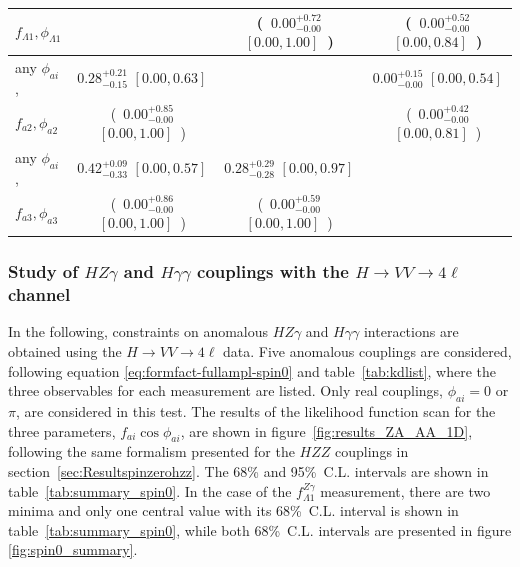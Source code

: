 \begin{table}
\begin{tabular}{lccc}
$f_{\Lambda1},\phi_{\Lambda1}$&   ~~~~  &   (~$0.00^{+0.72}_{-0.00}$ $[0.00,1.00]$~) &(~$0.00^{+0.52}_{-0.00}$ $[0.00,0.84]$~)  \\ \hline
any $\phi_{ai}$,
 &  $0.28^{+0.21}_{-0.15}$ $[0.00,0.63]$ &    ~~~~ &   $0.00^{+0.15}_{-0.00}$ $[0.00,0.54]$  \\
$f_{a2},\phi_{a2}$&   (~$0.00^{+0.85}_{-0.00}$ $[0.00,1.00]$~) &   ~~~~ & (~$0.00^{+0.42}_{-0.00}$ $[0.00,0.81]$~)  \\ \hline
any $\phi_{ai}$,
&  $0.42^{+0.09}_{-0.33}$ $[0.00,0.57]$ &   $0.28^{+0.29}_{-0.28}$ $[0.00,0.97]$ &    ~~~~  \\
$f_{a3},\phi_{a3}$&   (~$0.00^{+0.86}_{-0.00}$ $[0.00,1.00]$~) &   (~$0.00^{+0.59}_{-0.00}$ $[0.00,1.00]$~) & ~~~~  \\
\end{tabular}
\label{tab:Spin0_ZZ_1D_KDb}
\end{table}


\subsubsection{Study of \texorpdfstring{$HZ\gamma$}{HZgamma} and \texorpdfstring{$H\gamma\gamma$}{Hgammagamma} couplings with the \texorpdfstring{$H\to VV\to4\ell$}{H to VV to 4l} channel}  \label{sec:Resultspinzerohzg}

In the following, constraints on anomalous $HZ\gamma$ and $H\gamma\gamma$ interactions
are obtained using the $H\to VV\to 4\ell$ data. Five anomalous couplings are considered,
following equation \eqref{eq:formfact-fullampl-spin0} and table~\ref{tab:kdlist}, where the three
observables for each measurement are listed. Only real couplings, $\phi_{ai}=0$ or $\pi$,
are considered in this test. The results of the likelihood function scan for the three parameters,
$f_{ai}\cos\phi_{ai}$, are shown in figure~\ref{fig:results_ZA_AA_1D}, following the same
formalism presented for the $HZZ$ couplings in section~\ref{sec:Resultspinzerohzz}.
The 68\% and 95\%~C.L. intervals are shown in table~\ref{tab:summary_spin0}.
In the case of the $f_{\Lambda1}^{Z\gamma}$ measurement, there are two minima and only
one central value with its 68\%~C.L. interval is shown in table~\ref{tab:summary_spin0},
while both 68\%~C.L. intervals are presented in figure \ref{fig:spin0_summary}.

